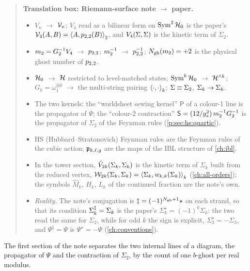 \begin{quote}
  \small
  \textbf{Translation box: Riemann-surface note $\to$ paper.}
  \begin{itemize}
    \setlength{\itemsep}{0.3ex}
    \item $V_n$ $\to$ $\vertex{n}$; $V_4$ read as a bilinear form on $\Sym^2 \Hilb_0$ is the paper's $\vertex{4}(A, B) = \pair[2]{A}{\sprod{2}{2}(B)}$, and $V_4(\Sig, \Sig)$ is the kinetic term of $\Sigma_2$.
    \item $\mtwo = G_2^{-1} V_4$ $\to$ $\sprod{2}{2}$; $\mtwo^{-1}$ $\to$ $\sprod{2}{2}^{-1}$; $\Ngh(\mtwo) = + 2$ is the physical ghost number of $\sprod{2}{2}$.
    \item $\Hilb_0$ $\to$ $\Hs$ restricted to level-matched states; $\Sym^k \Hilb_0$ $\to$ $\Hn{k}$; $G_k = \omega_1^{\otimes k}$ $\to$ the multi-string pairing $\pair[k]{\cdot}{\cdot}$; $\Sig \equiv \Sigma_2$, $\Sig_k \to \Sigma_k$.
    \item The two kernels: the \enquote{worldsheet sewing kernel} $\mathsf P$ of a colour-1 line is the propagator of $\Psi$; the \enquote{colour-2 contraction} $\mathsf S = (12 / \gs^2) \, \mtwo^{-1} G_2^{-1}$ is the propagator of $\Sigma_2$ of the Feynman rules (\cref{p:sec:hs:quartic}).
    \item HS (Hubbard--Stratonovich) Feynman rules are the Feynman rules of the cubic action; $\pklg$ are the maps of the IBL structure of \cref{ch:ibl}.
    \item In the tower section, $\tilde V_{2k}(\Sig_k, \Sig_k)$ is the kinetic term of $\Sigma_k$ built from the reduced vertex, $\dvertex{2k}(\Sigma_k, \Sigma_k) = \pair[k]{\Sigma_k}{\wprod{k}{k}(\Sigma_k)}$ (\cref{ch:all-orders}); the symbols $\hat M_k$, $\hat H_k$, $L_k$ of the continued fraction are the note's own.
    \item \emph{Reality.} The note's conjugation is $\ddagger = (-1)^{\Ngh + 1} \star$ on each strand, so that its condition $\Sig_k^\ddagger = \Sig_k$ is the paper's $\Sigma_k^\star = (-1)^k \Sigma_k$: the two read the same for $\Sigma_2$, while for odd $k$ the sign is explicit, $\Sigma_3^\star = - \Sigma_3$, and $\Psi^\ddagger = \Psi$ is $\Psi^\star = - \Psi$ (\cref{ch:conventions}).
  \end{itemize}
\end{quote}

The first section of the note separates the two internal lines of a diagram, the propagator of $\Psi$ and the contraction of $\Sigma_2$, by the count of one $b$-ghost per real modulus.

